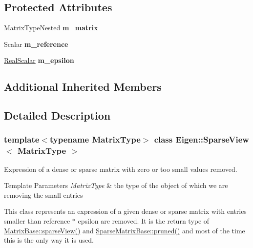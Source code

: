 \subsection*{Protected Attributes}
\begin{DoxyCompactItemize}
\item 
\mbox{\label{class_eigen_1_1_sparse_view_af7f373fad8b84ee90fbef68ae958284e}} 
Matrix\+Type\+Nested {\bfseries m\+\_\+matrix}
\item 
\mbox{\label{class_eigen_1_1_sparse_view_a98dd015bea709637b3175729c68bdd39}} 
Scalar {\bfseries m\+\_\+reference}
\item 
\mbox{\label{class_eigen_1_1_sparse_view_adf9350e7fd2a4452fb2a02b2498f3bde}} 
\mbox{\hyperlink{class_eigen_1_1_sparse_matrix_base_aaec8ace6efb785c81d442931c3248d88}{Real\+Scalar}} {\bfseries m\+\_\+epsilon}
\end{DoxyCompactItemize}
\subsection*{Additional Inherited Members}


\subsection{Detailed Description}
\subsubsection*{template$<$typename Matrix\+Type$>$\newline
class Eigen\+::\+Sparse\+View$<$ Matrix\+Type $>$}

Expression of a dense or sparse matrix with zero or too small values removed. 


\begin{DoxyTemplParams}{Template Parameters}
{\em Matrix\+Type} & the type of the object of which we are removing the small entries\\
\hline
\end{DoxyTemplParams}
This class represents an expression of a given dense or sparse matrix with entries smaller than {\ttfamily reference} $\ast$ {\ttfamily epsilon} are removed. It is the return type of \mbox{\hyperlink{class_eigen_1_1_matrix_base_a320dd291cbf4339c6118c41521b75350}{Matrix\+Base\+::sparse\+View()}} and \mbox{\hyperlink{class_eigen_1_1_sparse_matrix_base_ac8d0414b56d9d620ce9a698c1b281e5d}{Sparse\+Matrix\+Base\+::pruned()}} and most of the time this is the only way it is used.

